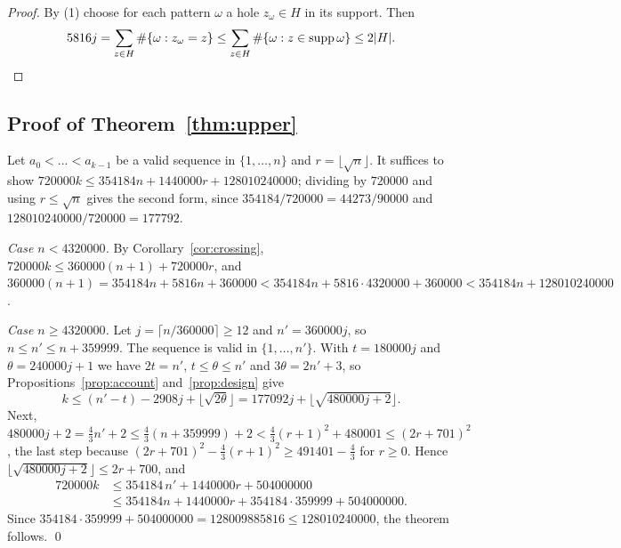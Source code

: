 \documentclass[11pt]{amsart}
\theoremstyle{remark}
\newcommand{\isqrt}[1]{\lfloor\sqrt{#1}\rfloor}
\begin{document}
\begin{proof}
By (1) choose for each pattern $\omega$ a hole $z_\omega\in H$ in its support. Then
\[
  5816j=\sum_{z\in H}\#\{\omega:z_\omega=z\}\le\sum_{z\in H}\#\{\omega: z\in\operatorname{supp}\omega\}\le2|H|.\qedhere
\]
\end{proof}

\subsection{Proof of Theorem~\ref{thm:upper}}

Let $a_0<\dots<a_{k-1}$ be a valid sequence in $\{1,\dots,n\}$ and $r=\isqrt n$. It suffices to show
$720000k\le354184n+1440000r+128010240000$; dividing by $720000$ and using $r\le\sqrt n$ gives the second form, since
$354184/720000=44273/90000$ and $128010240000/720000=177792$.

\emph{Case $n<4320000$.} By Corollary~\ref{cor:crossing}, $720000k\le360000(n+1)+720000r$, and
$360000(n+1)=354184n+5816n+360000<354184n+5816\cdot4320000+360000<354184n+128010240000$.

\emph{Case $n\ge4320000$.} Let $j=\lceil n/360000\rceil\ge12$ and $n'=360000j$, so $n\le n'\le n+359999$. The sequence is valid in
$\{1,\dots,n'\}$. With $t=180000j$ and $\theta=240000j+1$ we have $2t=n'$, $t\le\theta\le n'$ and $3\theta=2n'+3$, so
Propositions~\ref{prop:account} and~\ref{prop:design} give
\[
  k\le(n'-t)-2908j+\isqrt{2\theta}=177092j+\isqrt{480000j+2}.
\]
Next, $480000j+2=\frac43n'+2\le\frac43(n+359999)+2<\frac43(r+1)^2+480001\le(2r+701)^2$, the last step because
$(2r+701)^2-\frac43(r+1)^2\ge491401-\frac43$ for $r\ge0$. Hence $\isqrt{480000j+2}\le2r+700$, and
\begin{align*}
  720000k&\le354184\,n'+1440000r+504000000\\
  &\le354184n+1440000r+354184\cdot359999+504000000 .
\end{align*}
Since $354184\cdot359999+504000000=128009885816\le128010240000$, the theorem follows. \qed
\end{document}
